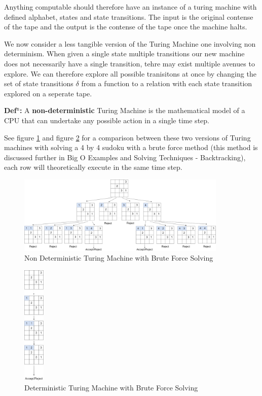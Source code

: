 \documentclass[a4paper,11pt]{report}
\newcounter{row}
\begin{document}
Anything computable should therefore have an instance of a turing machine with defined alphabet, states and state transitions. The input is the original contense of the tape and the output is the contense of the tape once the machine halts. 

We now consider a less tangible version of the Turing Machine one involving non determinism. When given a single state multiple transitions our new machine does not necessarily have a single transition, tehre may exist multiple avenues to explore. We can therefore explore all possible tranisitons at once by changing the set of state transitions $\delta$ from a function to a relation with each state transition explored on a seperate tape. 

\textbf{Def$^\text{n}$:} A \textbf{non-deterministic} Turing Machine is the mathematical model of a CPU that can undertake any possible action in a single time step.

See figure \ref{ndtm} and figure \ref{dtm} for a comparison between these two versions of Turing machines with solving a 4 by 4 sudoku with a brute force method (this method is discussed further in Big O Examples and Solving Techniques - Backtracking), each row will theoretically execute in the same time step.

\begin{figure}[h!]
	\begin{center}
		\includegraphics[width=100mm]{figures/turing_non_determinism.png}
	\end{center}
	\caption{\label{ndtm} Non Deterministic Turing Machine with Brute Force Solving}
\end{figure}

\begin{figure}[h!]
	\begin{center}
		\includegraphics[width=10mm]{figures/turing_determinism.png}
	\end{center}
	\caption{\label{dtm} Deterministic Turing Machine with Brute Force Solving}
\end{figure}
\end{document}
